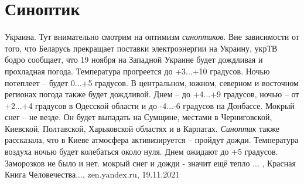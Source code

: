  
 
 
 
 
\chapter{Синоптик}
\label{sec:slova.sinoptik}

Украина. Тут внимательно смотрим на оптимизм \emph{синоптиков}. Вне зависимости от
того, что Беларусь прекращает поставки электроэнергии на Украину, укрТВ бодро
сообщает, что 19 ноября на Западной Украине будет дождливая и прохладная
погода. Температура прогреется до +3...+10 градусов. Ночью потеплеет – будет
0...+5 градусов.  В центральном, южном, северном и восточном регионах погода
также будет дождливой. Днем – до +4...+9 градусов, ночью – от +2...+4 градусов
в Одесской области и до -4...-6 градусов на Донбассе.  Мокрый снег – не везде.
Он будет выпадать на Сумщине, местами в Черниговской, Киевской, Полтавской,
Харьковской областях и в Карпатах.  \emph{Синоптик} также рассказала, что в Киеве
атмосфера активизируется – пройдут дожди. Температура воздуха ночью будет
колебаться около нуля. Днем ожидают до +5 градусов. Заморозков не было и нет.
мокрый снег и дожди - значит ещё тепло ...
, Красная Книга Человечества..., zen.yandex.ru, 19.11.2021
